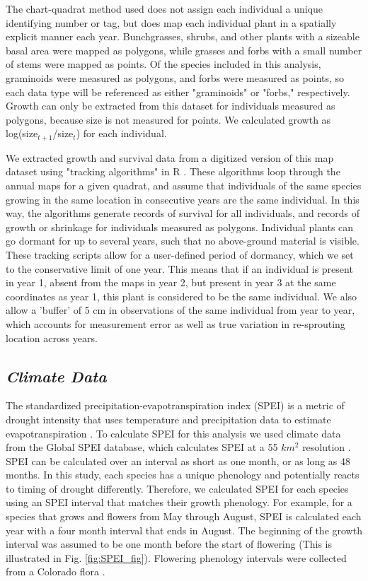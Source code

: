 \documentclass[12pt, letterpaper]{article}
\begin{document}
The chart-quadrat method used does not assign each individual a unique identifying number or tag, but does map each individual plant in a spatially explicit manner each year. Bunchgrasses, shrubs, and other plants with a sizeable basal area were mapped as polygons, while grasses and forbs with a small number of stems were mapped as points. Of the species included in this analysis, graminoids were measured as polygons, and forbs were measured as points, so each data type will be referenced as either "graminoids" or "forbs," respectively.  Growth can only be extracted from this dataset for individuals measured as polygons, because size is not measured for points. We calculated growth as log(size$_{t+1}$/size$_t$) for each individual.  

We extracted growth and survival data from a digitized version of this map dataset using "tracking algorithms" in R \citep{Lauenroth2008, RCoreTeam2019}. These algorithms loop through the annual maps for a given quadrat, and assume that individuals of the same species growing in the same location in consecutive years are the same individual. In this way, the algorithms generate records of survival for all individuals, and records of growth or shrinkage for individuals measured as polygons. Individual plants can go dormant for up to several years, such that no above-ground material is visible. These tracking scripts allow for a user-defined period of dormancy, which we set to the conservative limit of one year. This means that if an individual is present in year 1, absent from the maps in year 2, but present in year 3 at the same coordinates as year 1, this plant is considered to be the same individual. We also allow a 'buffer' of 5 cm in observations of the same individual from year to year, which accounts for measurement error as well as true variation in re-sprouting location across years. 
\subsection{\textit{Climate Data}} The standardized precipitation-evapotranspiration index (SPEI) is a metric of drought intensity that uses temperature and precipitation data to estimate evapotranspiration \citep{Vicente-Serrano2010}.  To calculate SPEI for this analysis we used climate data from the Global SPEI database, which calculates SPEI at a 55 $km^2$ resolution \citep{Vicente-Serrano2010}. SPEI can be calculated over an interval as short as one month, or as long as 48 months. In this study, each species has a unique phenology and potentially reacts to timing of drought differently. Therefore, we calculated SPEI for each species using an SPEI interval that matches their growth phenology. For example, for a species that grows and flowers from May through August, SPEI is calculated each year with a four month interval that ends in August. The beginning of the growth interval was assumed to be one month before the start of flowering (This is illustrated in Fig. \ref{fig:SPEI_fig}). Flowering phenology intervals were collected from a Colorado flora \citep{Ackerfield2015}.  
\end{document}
